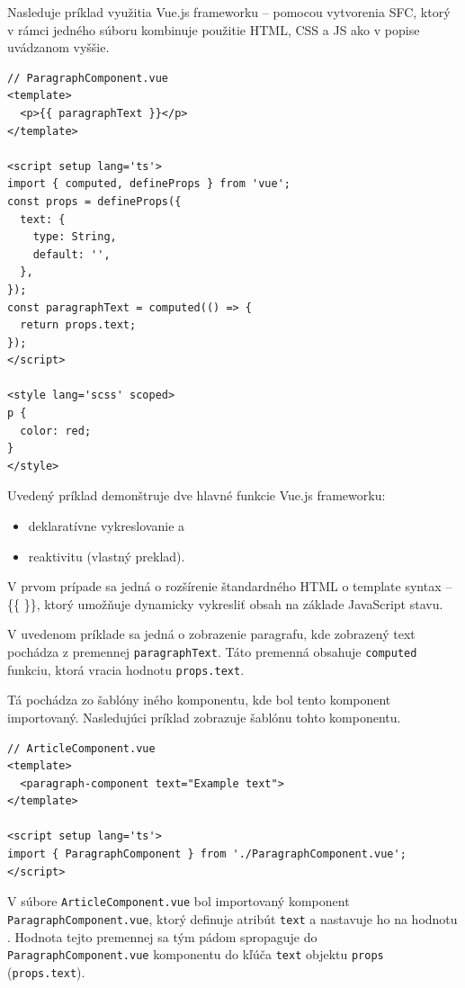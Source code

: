 Nasleduje príklad využitia Vue.js frameworku -- pomocou vytvorenia SFC, ktorý v rámci jedného súboru kombinuje použitie HTML, CSS a JS ako v popise uvádzanom vyššie.

\begin{minipage}[]{\linewidth}
\begin{verbatim}
// ParagraphComponent.vue
<template>
  <p>{{ paragraphText }}</p>
</template>

<script setup lang='ts'>
import { computed, defineProps } from 'vue';
const props = defineProps({
  text: {
    type: String,
    default: '',
  },
});
const paragraphText = computed(() => {
  return props.text;
});
</script>

<style lang='scss' scoped>
p {
  color: red;
}
</style>
\end{verbatim}
\end{minipage}

\clearpage

Uvedený príklad demonštruje dve hlavné funkcie Vue.js frameworku:
\begin {itemize}
\item {deklaratívne vykreslovanie a}
\item {reaktivitu \cite{vuejs_introduction} (vlastný preklad).}
\end {itemize}

V prvom prípade sa jedná o rozšírenie štandardného HTML o template syntax -- \{\{ \}\}, ktorý umožňuje dynamicky vykresliť obsah na základe JavaScript stavu.

V uvedenom príklade sa jedná o zobrazenie paragrafu, kde zobrazený text pochádza z premennej \texttt{paragraphText}. Táto premenná obsahuje \texttt{computed} funkciu, ktorá vracia hodnotu \texttt{props.text}.

Tá pochádza zo šablóny iného komponentu, kde bol tento komponent importovaný. Nasledujúci príklad zobrazuje šablónu tohto komponentu.

\begin{minipage}[]{\linewidth}
\begin{verbatim}
// ArticleComponent.vue
<template>
  <paragraph-component text="Example text">
</template>

<script setup lang='ts'>
import { ParagraphComponent } from './ParagraphComponent.vue';
</script>
\end{verbatim}
\end{minipage}

V súbore \texttt{ArticleComponent.vue} bol importovaný komponent \newline \texttt{ParagraphComponent.vue}, ktorý definuje atribút \texttt{text} a nastavuje ho na hodnotu . Hodnota tejto premennej sa tým pádom spropaguje do
\texttt{ParagraphComponent.vue} komponentu do kľúča \texttt{text} objektu \texttt{props} (\texttt{props.text}).

